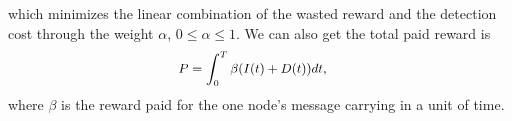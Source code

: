 which minimizes the linear combination of
the wasted reward and the detection cost through the weight $\alpha$, $0 \le \alpha \le 1$.
We can also get the total paid reward is
\begin{equation}
\begin{small}
\label{eq:reward}
\begin{aligned}
P &= \int_{0}^{T} \beta ( I(t) + D(t) )dt,
\end{aligned}
\end{small}
\end{equation}
where $\beta$ is the reward paid for the one node's message carrying in a unit of time.
